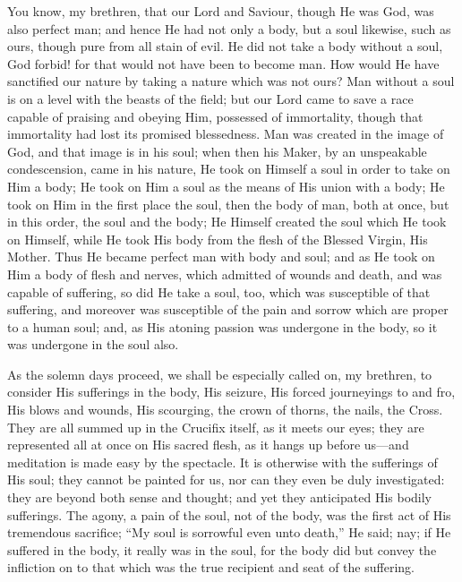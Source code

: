 You know, my brethren, that our Lord and Saviour, though He was
God, was also perfect man; and hence He had not only a body, but a
soul likewise, such as ours, though pure from all stain of evil. He
did not take a body without a soul, God forbid! for that would not
have been to become man. How would He have sanctified our nature by
taking a nature which was not ours? Man without a soul is on a level
with the beasts of the field; but our Lord came to save a race capable
of praising and obeying Him, possessed of immortality, though that
immortality had lost its promised blessedness. Man was created in the
image of God, and that image is in his soul; when then his Maker, by
an unspeakable condescension, came in his nature, He took on Himself a
soul in order to take on Him a body; He took on Him a soul as the
means of His union with a body; He took on Him in the first place the
soul, then the body of man, both at once, but in this order, the soul
and the body; He Himself created the soul which He took on Himself,
while He took His body from the flesh of the Blessed Virgin, His
Mother. Thus He became perfect man with body and soul; and as He took
on Him a body of flesh and nerves, which admitted of wounds and death,
and was capable of suffering, so did He take a soul, too, which was
susceptible of that suffering, and moreover was susceptible of the
pain and sorrow which are proper to a human soul; and, as His atoning
passion was undergone in the body, so it was undergone in the soul
also.

As the solemn days proceed, we shall be especially called on, my
brethren, to consider His sufferings in the body, His seizure, His
forced journeyings to and fro, His blows and wounds, His scourging,
the crown of thorns, the nails, the Cross. They are all summed up in
the Crucifix itself, as it meets our eyes; they are represented all at
once on His sacred flesh, as it hangs up before us—and meditation is
made easy by the spectacle. It is otherwise with the sufferings of His
soul; they cannot be painted for us, nor can they even be duly
investigated: they are beyond both sense and thought; and yet they
anticipated His bodily sufferings. The agony, a pain of the soul, not
of the body, was the first act of His tremendous sacrifice; ``My
soul is sorrowful even unto death,'' He said; nay; if He suffered
in the body, it really was in the soul, for the body did but convey
the infliction on to that which was the true recipient and seat of the
suffering.

